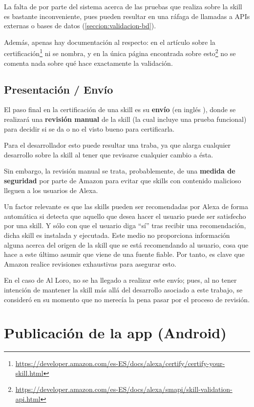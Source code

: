 \documentclass[11pt,spanish,listoffigures,listoftables,table,hyphens,dvipsnames]{tfgetsinf}
\newcommand{\fe}[1]{\foreign{english}{#1}}
\begin{document}
La falta de \fe{feedback} por parte del sistema acerca de las pruebas que realiza sobre la skill es bastante inconveniente, pues pueden resultar en una ráfaga de llamadas a APIs externas o bases de datos (\ref{seccion:validacion-bd}).

Además, apenas hay documentación al respecto: en el artículo sobre la certificación\footnote{\url{https://developer.amazon.com/es-ES/docs/alexa/certify/certify-your-skill.html}} ni se nombra, y en la única página encontrada sobre esto\footnote{\url{https://developer.amazon.com/es-ES/docs/alexa/smapi/skill-validation-api.html}} no se comenta nada sobre qué hace exactamente la validación.

\subsection{Presentación / Envío}

El paso final en la certificación de una skill es su \textbf{envío} (en inglés \fe{submission}), donde se realizará una \textbf{revisión manual} de la skill (la cual incluye una prueba funcional) para decidir si se da o no el visto bueno para certificarla.

Para el desarrollador esto puede resultar una traba, ya que alarga cualquier desarrollo sobre la skill al tener que revisarse cualquier cambio a ésta.

Sin embargo, la revisión manual se trata, probablemente, de una \textbf{medida de seguridad} por parte de Amazon para evitar que skills con contenido malicioso lleguen a los usuarios de Alexa.

Un factor relevante es que las skills pueden ser recomendadas por Alexa de forma automática si detecta que aquello que desea hacer el usuario puede ser satisfecho por una skill. Y sólo con que el usuario diga ``sí'' tras recibir una recomendación, dicha skill es instalada y ejecutada. Este medio no proporciona información alguna acerca del origen de la skill que se está recomendando al usuario, cosa que hace a este último asumir que viene de una fuente fiable. Por tanto, es clave que Amazon realice revisiones exhaustivas para asegurar esto.

En el caso de Al Loro, no se ha llegado a realizar este envío; pues, al no tener intención de mantener la skill más allá del desarrollo asociado a este trabajo, se consideró en su momento que no merecía la pena pasar por el proceso de revisión.

\section{Publicación de la app (Android)}
\end{document}
